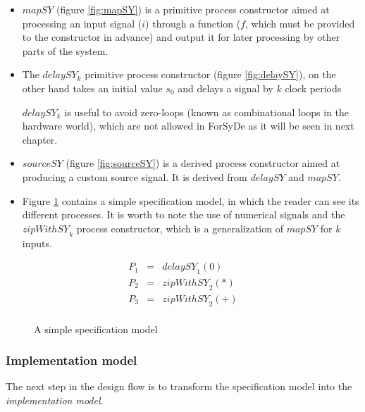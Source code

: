 \begin{itemize}

\item $\mathit{mapSY}$ (figure \ref{fig:mapSY}) is a primitive process
  constructor aimed at processing an input signal ($i$) through a
  function ($f$, which must be provided to the constructor in advance)
  and output it for later processing by other parts of the system.

\item The $\mathit{delaySY_k}$ primitive process constructor (figure
  \ref{fig:delaySY}), on the other hand takes an initial value $s_0$
  and delays a signal  by $k$ clock periods

  $\mathit{delaySY_k}$ is useful to avoid zero-loops (known as
  combinational loops in the hardware world), which are not allowed in
  ForSyDe as it will be seen in next chapter.

\item $\mathit{sourceSY}$ (figure \ref{fig:sourceSY}) is a derived process
  constructor aimed at producing a custom source signal. It is derived from
  $\mathit{delaySY}$ and $\mathit{mapSY}$.

\item Figure \ref{fig:simpspec} contains a simple specification model,
  in which the reader can see its different processes. It is worth to
  note the use of numerical signals and the $\mathit{zipWithSY}_k$
  process constructor, which is a generalization of $\mathit{mapSY}$
  for $k$ inputs.
\end{itemize}


\begin{figure}
\centering

\begin{eqnarray*}
  P_1 & = & \mathit{delaySY}_1(0) \\
  P_2 & = & \mathit{zipWithSY}_2(*) \\
  P_3 & = & \mathit{zipWithSY}_2(+) \\
\end{eqnarray*}
\caption{A simple specification model}
\label{fig:simpspec}
\end{figure}

\subsubsection{Implementation model}
The next step in the design flow is to transform the specification
model into the \textit{implementation model}.


